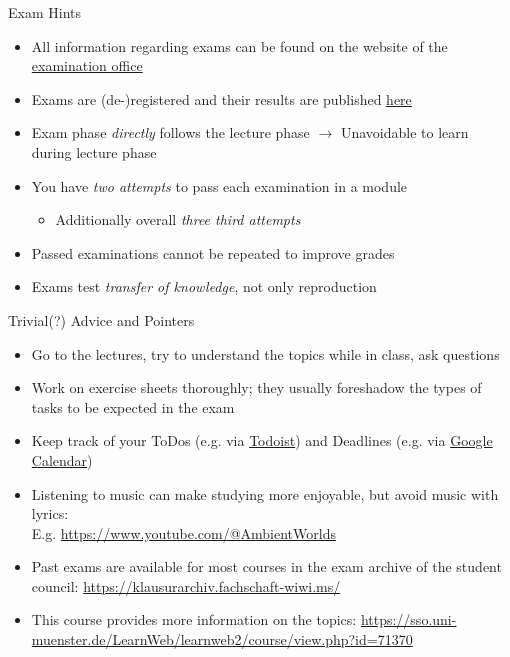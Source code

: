 \documentclass{ercisbeamer}
\begin{document}
\begin{frame}{Exam Hints}
    \begin{itemize}
        \item All information regarding exams can be found on the website of the \href{https://www.wiwi.uni-muenster.de/pam/en/examinations/schedule-examination-offer-examination-rooms}{examination office}
        \item Exams are (de-)registered and their results are published \href{https://pam-portal.uni-muenster.de/}{here}
        \item Exam phase \emph{directly} follows the lecture phase $\rightarrow$ Unavoidable to learn during lecture phase
        \item You have \emph{two attempts} to pass each examination in a module
        \begin{itemize}
            \item Additionally overall \emph{three third attempts}
        \end{itemize}
        \item Passed examinations cannot be repeated to improve grades
        \item Exams test \emph{transfer of knowledge}, not only reproduction
    \end{itemize}
\end{frame}

\begin{frame}{Trivial(?) Advice and Pointers}
    \begin{itemize}
        \item Go to the lectures, try to understand the topics while in class, ask questions
        \item Work on exercise sheets thoroughly; they usually foreshadow the types of tasks to be expected in the exam
        \item Keep track of your ToDos (e.g. via \href{https://todoist.com/}{Todoist}) and Deadlines (e.g. via \href{https://workspace.google.com/products/calendar/}{Google Calendar})
        \item Listening to music can make studying more enjoyable, but avoid music with lyrics: \\ E.g. \url{https://www.youtube.com/@AmbientWorlds}
        \item Past exams are available for most courses in the exam archive of the student council: \url{https://klausurarchiv.fachschaft-wiwi.ms/}
        \item This course  provides more information on the topics: \url{https://sso.uni-muenster.de/LearnWeb/learnweb2/course/view.php?id=71370}
    \end{itemize}
\end{frame}
\end{document}
